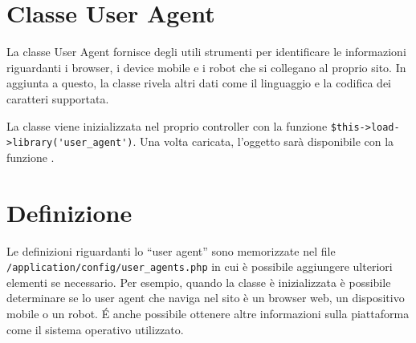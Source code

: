 \section{Classe User Agent}
\label{class:useragent}

La classe User Agent fornisce degli utili strumenti per identificare le informazioni riguardanti i browser, i device mobile e i robot che si collegano al proprio sito. In aggiunta a questo, la classe rivela altri dati come il linguaggio e la codifica dei caratteri supportata.

La classe viene inizializzata nel proprio controller con la funzione \verb|$this->load->library('user_agent')|. Una volta caricata, l'oggetto sarà disponibile con la funzione .

\section*{Definizione}
Le definizioni riguardanti lo ``user agent'' sono memorizzate nel file \verb|/application/config/user_agents.php| in cui è possibile aggiungere ulteriori elementi se necessario. Per esempio, quando la classe è inizializzata è possibile determinare se lo user agent che naviga nel sito è un browser web, un dispositivo mobile o un robot. \'E anche possibile ottenere altre informazioni sulla piattaforma come il sistema operativo utilizzato.


